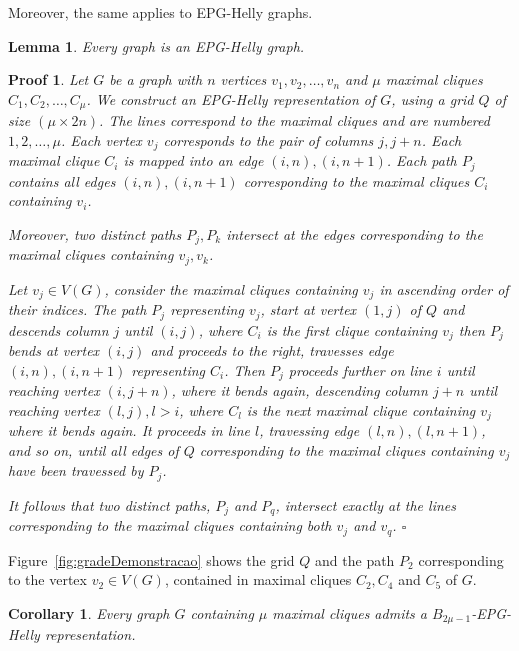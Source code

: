 \documentclass[9pt]{entcs}
\newtheorem{lema}{Lemma}[section]
\newtheorem{coro}{Corollary}[section]
\newtheorem{prove}{Proof}[section]
\begin{document}
 Moreover, the same applies to EPG-Helly graphs. 
 
 \begin{lema}\label{lem:todoGrafoEpgHelly}
 Every graph is an EPG-Helly graph.
 \end{lema}
 \setcounter{prove}{1}
  \begin{prove}
  Let $G$ be a graph with $n$ vertices $v_1, v_2, \dots, v_n$ and $\mu$ maximal cliques $C_1, C_2, \dots , C_{\mu }$. We construct an EPG-Helly representation of $G$, using a grid $Q$ of size $(\mu \times 2n)$. The lines correspond to the maximal cliques and are numbered $1, 2, \dots , \mu$. Each vertex $v_j$ corresponds to the pair of columns $j, j+n$. Each maximal clique $C_i$ is mapped into an edge $(i,n), (i,n+1)$. Each path $P_j$ contains all edges $(i,n), (i,n+1)$ corresponding to the maximal cliques $C_i$ containing $v_i$.
  
  Moreover, two distinct paths $P_j,P_k$ intersect at the edges corresponding to the maximal cliques containing $v_j,v_k$.
  
  Let $v_j \in V(G)$, consider the maximal cliques containing $v_j$ in ascending order of their indices. The path $P_j$ representing $v_j$, start at vertex $(1,j)$ of $Q$ and descends column $j$ until $(i,j)$, where $C_i$ is the first clique containing $v_j$ then $P_j$ bends at vertex $(i,j)$ and proceeds to the right, travesses edge $(i,n), (i,n+1)$ representing $C_i$. Then $P_j$ proceeds further on line $i$ until reaching vertex $(i, j+n)$, where it bends again, descending column $j+n$ until reaching vertex $(l,j), l>i$, where $C_l$ is the next maximal clique containing $v_j$ where it bends again. It proceeds in line $l$, travessing edge $(l,n),(l,n+1)$, and so on, until all edges of $Q$ corresponding to the maximal cliques containing $v_j$ have been travessed by $P_j$.   
  
It follows that two distinct paths, $P_j$ and $P_q$, intersect exactly at the lines corresponding to the maximal cliques containing both $v_j$ and $v_q$.  
  $\square$ \end{prove}
 
 Figure~\ref{fig:gradeDemonstracao} shows the grid $Q$ and the path $P_2$ corresponding to the vertex $v_2 \in V(G)$, contained in maximal cliques $C_2, C_4$ and $C_5$ of $G$.
 
  
 
 
 \begin{coro}
 Every graph $G$ containing $\mu$ maximal cliques admits a $B_{2\mu -1}$-EPG-Helly representation. %
 \end{coro}
 
\end{document}
